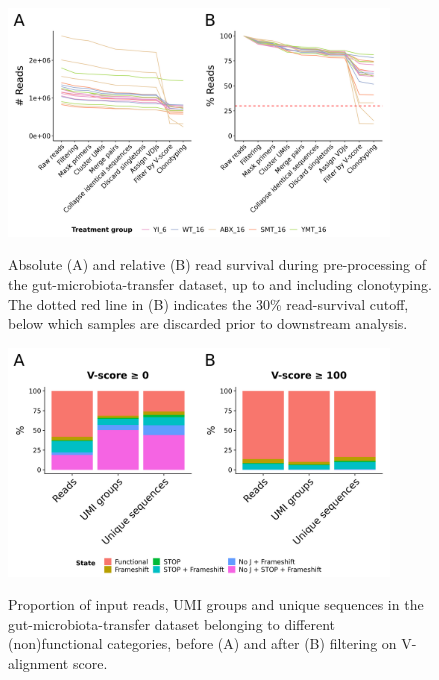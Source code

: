 \begin{figure}
\centering
\includegraphics[width = 0.9\textwidth]{_Figures/png/gut-read-survival-all.png}
\begin{subfigure}{0em}
\label{fig:igseq-gut-read-survival-all-abs}
\end{subfigure}
\begin{subfigure}{0em}
\label{fig:igseq-gut-read-survival-all-rel}
\end{subfigure}
\caption{Absolute (A) and relative (B) read survival during pre-processing of the \igseq gut-microbiota-transfer dataset, up to and including clonotyping. The dotted red line in (B) indicates the 30\% read-survival cutoff, below which samples are discarded prior to downstream analysis.}
\label{fig:igseq-gut-read-survival-all}
\end{figure}

\begin{figure}
\centering
\includegraphics[width = 0.9\textwidth]{_Figures/png/gut-functional-prop}
\begin{subfigure}{0em}
\label{fig:igseq-gut-functional-prop-pre}
\end{subfigure}
\begin{subfigure}{0em}
\label{fig:igseq-gut-functional-prop-post}
\end{subfigure}
\caption{Proportion of input reads, UMI groups and unique sequences in the \igseq gut-microbiota-transfer dataset belonging to different (non)functional categories, before (A) and after (B) filtering on V-alignment score.}
\label{fig:igseq-gut-functional-prop}
\end{figure}

